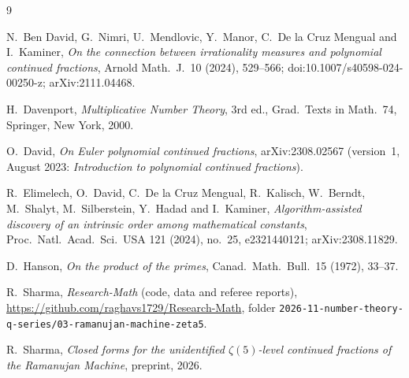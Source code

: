 \documentclass[11pt]{amsart}
\theoremstyle{definition}
\theoremstyle{remark}
\numberwithin{equation}{section}
\newcommand{\repo}{2026-11-number-theory-q-series/03-ramanujan-machine-zeta5}
\begin{document}
\begin{thebibliography}{9}

 N.~Ben David, G.~Nimri, U.~Mendlovic, Y.~Manor, C.~De la Cruz Mengual and I.~Kaminer, \emph{On the connection between irrationality measures and polynomial continued fractions}, Arnold Math.\ J.\ 10 (2024), 529--566; doi:10.1007/s40598-024-00250-z; arXiv:2111.04468.

 H.~Davenport, \emph{Multiplicative Number Theory}, 3rd ed., Grad.\ Texts in Math.\ 74, Springer, New York, 2000.

 O.~David, \emph{On Euler polynomial continued fractions}, arXiv:2308.02567 (version~1, August 2023: \emph{Introduction to polynomial continued fractions}).

 R.~Elimelech, O.~David, C.~De la Cruz Mengual, R.~Kalisch, W.~Berndt, M.~Shalyt, M.~Silberstein, Y.~Hadad and I.~Kaminer, \emph{Algorithm-assisted discovery of an intrinsic order among mathematical constants}, Proc.\ Natl.\ Acad.\ Sci.\ USA 121 (2024), no.~25, e2321440121; arXiv:2308.11829.

 D.~Hanson, \emph{On the product of the primes}, Canad.\ Math.\ Bull.\ 15 (1972), 33--37.

 R.~Sharma, \emph{Research-Math} (code, data and referee reports), \url{https://github.com/raghavs1729/Research-Math}, folder \nolinkurl{\repo}.

 R.~Sharma, \emph{Closed forms for the unidentified $\zeta(5)$-level continued fractions of the Ramanujan Machine}, preprint, 2026.

\end{thebibliography}
\end{document}

